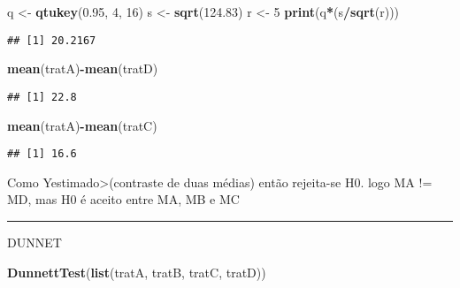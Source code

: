 \documentclass[
]{article}
\newenvironment{Shaded}{\begin{snugshade}}{\end{snugshade}}
\newcommand{\DecValTok}[1]{\textcolor[rgb]{0.00,0.00,0.81}{#1}}
\newcommand{\FloatTok}[1]{\textcolor[rgb]{0.00,0.00,0.81}{#1}}
\newcommand{\FunctionTok}[1]{\textcolor[rgb]{0.13,0.29,0.53}{\textbf{#1}}}
\newcommand{\NormalTok}[1]{#1}
\newcommand{\OtherTok}[1]{\textcolor[rgb]{0.56,0.35,0.01}{#1}}
\newcommand{\SpecialCharTok}[1]{\textcolor[rgb]{0.81,0.36,0.00}{\textbf{#1}}}
\begin{document}
\begin{Shaded}
\begin{Highlighting}[]
\NormalTok{q }\OtherTok{\textless{}{-}} \FunctionTok{qtukey}\NormalTok{(}\FloatTok{0.95}\NormalTok{, }\DecValTok{4}\NormalTok{, }\DecValTok{16}\NormalTok{) }
\NormalTok{s }\OtherTok{\textless{}{-}} \FunctionTok{sqrt}\NormalTok{(}\FloatTok{124.83}\NormalTok{)}
\NormalTok{r }\OtherTok{\textless{}{-}} \DecValTok{5}
\FunctionTok{print}\NormalTok{(q}\SpecialCharTok{*}\NormalTok{(s}\SpecialCharTok{/}\FunctionTok{sqrt}\NormalTok{(r)))}
\end{Highlighting}
\end{Shaded}

\begin{verbatim}
## [1] 20.2167
\end{verbatim}

\begin{Shaded}
\begin{Highlighting}[]
\FunctionTok{mean}\NormalTok{(tratA)}\SpecialCharTok{{-}}\FunctionTok{mean}\NormalTok{(tratD)}
\end{Highlighting}
\end{Shaded}

\begin{verbatim}
## [1] 22.8
\end{verbatim}

\begin{Shaded}
\begin{Highlighting}[]
\FunctionTok{mean}\NormalTok{(tratA)}\SpecialCharTok{{-}}\FunctionTok{mean}\NormalTok{(tratC)}
\end{Highlighting}
\end{Shaded}

\begin{verbatim}
## [1] 16.6
\end{verbatim}

Como Yestimado\textgreater(contraste de duas médias) então rejeita-se
H0. logo MA != MD, mas H0 é aceito entre MA, MB e MC

\begin{center}\rule{0.5\linewidth}{0.5pt}\end{center}

DUNNET

\begin{Shaded}
\begin{Highlighting}[]
\FunctionTok{DunnettTest}\NormalTok{(}\FunctionTok{list}\NormalTok{(tratA, tratB, tratC, tratD))}
\end{Highlighting}
\end{Shaded}
\end{document}
